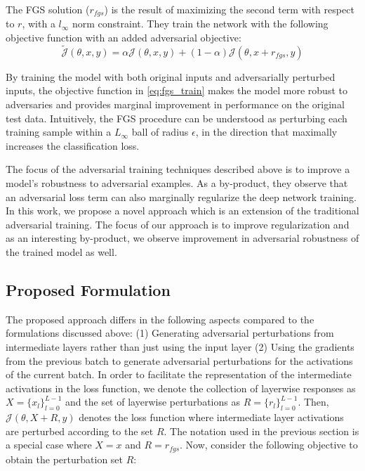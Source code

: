 \documentclass[letterpaper]{article} %
\begin{document}
The FGS solution ($r_{fgs}$) is the result of maximizing the second term with respect to $r$, with a $l_{\infty}$ norm constraint. They train the network with the following objective function with an added adversarial objective:
\begin{equation}
\tilde{\mathcal{J}}(\theta,x,y) = \alpha \mathcal{J}(\theta,x,y)+ (1-\alpha) \mathcal{J}(\theta,x+r_{fgs},y)
\label{eq:fgs_train}
\end{equation}


By training the model with both original inputs and adversarially perturbed inputs, the objective function in \ref{eq:fgs_train} makes the model more robust to adversaries and provides marginal improvement in performance on the original test data. Intuitively, the FGS procedure can be understood as perturbing each training sample within a $L_{\infty}$ ball of radius $\epsilon$, in the direction that maximally increases the classification loss. 

The focus of the adversarial training techniques described above is to improve a model's robustness to adversarial examples. As a by-product, they observe that an adversarial loss term can also marginally regularize the deep network training. In this work, we propose a novel approach which is an extension of the traditional adversarial training. The focus of our approach is to improve regularization and as an interesting by-product, we observe improvement in adversarial robustness of the trained model as well.

\subsection{Proposed Formulation}\label{subsec:formulation}
The proposed approach differs in the following aspects compared to the formulations discussed above: (1) Generating adversarial perturbations from intermediate layers rather than just using the input layer (2) Using the gradients from the previous batch to generate adversarial perturbations for the activations of the current batch. In order to facilitate the representation of the intermediate activations in the loss function, we denote the collection of layerwise responses as $X=\{x_l\}_{l=0}^{L-1}$ and  the set of layerwise perturbations as $R=\{r_l\}_{l=0}^{L-1}$. Then, $\mathcal{J}(\theta,X+R,y)$ denotes the loss function where intermediate layer activations are perturbed according to the set $R$. The notation used in the previous section is a special case where $X={x}$ and $R=r_{fgs}$. Now, consider the following objective to obtain the perturbation set $R$: 
\end{document}
